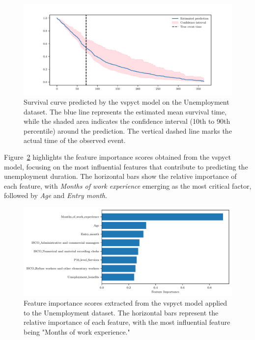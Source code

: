 \documentclass[3p,review,authoryear]{elsarticle}
\begin{document}
\begin{figure}[h!]
    \centering
    \includegraphics[width=1.0\textwidth]{pred_with_ci.pdf}
    \caption{Survival curve predicted by the \gls{vspyct} model on the Unemployment dataset. The blue line represents the estimated mean survival time, while the shaded area indicates the confidence interval (10th to 90th percentile) around the prediction. The vertical dashed line marks the actual time of the observed event.}
    \label{fig:pred_ci}
\end{figure}

Figure~\ref{fig:feature_importance} highlights the feature importance scores obtained from the \gls{vspyct} model, focusing on the most influential features that contribute to predicting the unemployment duration.
The horizontal bars show the relative importance of each feature, with \textit{Months of work experience} emerging as the most critical factor, followed by \textit{Age} and \textit{Entry month}.

\begin{figure}[h!]
    \centering
    \includegraphics[width=1.0\textwidth]{feature_importance.pdf}
    \caption{Feature importance scores extracted from the \gls{vspyct} model applied to the Unemployment dataset. The horizontal bars represent the relative importance of each feature, with the most influential feature being "Months of work experience."}
    \label{fig:feature_importance}
\end{figure}
\end{document}
